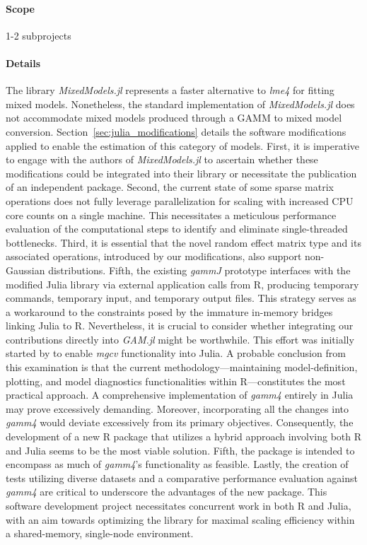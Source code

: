 \paragraph{Scope} 1-2 subprojects

\paragraph{Details} The library \textit{MixedModels.jl} represents a faster alternative to \textit{lme4} for fitting mixed models. Nonetheless, the standard implementation of \textit{MixedModels.jl} does not accommodate mixed models produced through a GAMM to mixed model conversion. Section~\ref{sec:julia_modifications} details the software modifications applied to enable the estimation of this category of models. First, it is imperative to engage with the authors of \textit{MixedModels.jl} to ascertain whether these modifications could be integrated into their library or necessitate the publication of an independent package. Second, the current state of some sparse matrix operations does not fully leverage parallelization for scaling with increased CPU core counts on a single machine. This necessitates a meticulous performance evaluation of the computational steps to identify and eliminate single-threaded bottlenecks. Third, it is essential that the novel random effect matrix type and its associated operations, introduced by our modifications, also support non-Gaussian distributions. Fifth, the existing \textit{gammJ} prototype interfaces with the modified Julia library via external application calls from R, producing temporary commands, temporary input, and temporary output files. This strategy serves as a workaround to the constraints posed by the immature in-memory bridges linking Julia to R. Nevertheless, it is crucial to consider whether integrating our contributions directly into \textit{GAM.jl} might be worthwhile. This effort was initially started by \cite{Henderson_GAMjl} to enable \textit{mgcv} functionality into Julia. A probable conclusion from this examination is that the current methodology—maintaining model-definition, plotting, and model diagnostics functionalities within R—constitutes the most practical approach. A comprehensive implementation of \textit{gamm4} entirely in Julia may prove excessively demanding. Moreover, incorporating all the changes into \textit{gamm4} would deviate excessively from its primary objectives. Consequently, the development of a new R package that utilizes a hybrid approach involving both R and Julia seems to be the most viable solution. Fifth, the package is intended to encompass as much of \textit{gamm4}'s functionality as feasible. Lastly, the creation of tests utilizing diverse datasets and a comparative performance evaluation against \textit{gamm4} are critical to underscore the advantages of the new package. This software development project necessitates concurrent work in both R and Julia, with an aim towards optimizing the library for maximal scaling efficiency within a shared-memory, single-node environment.

